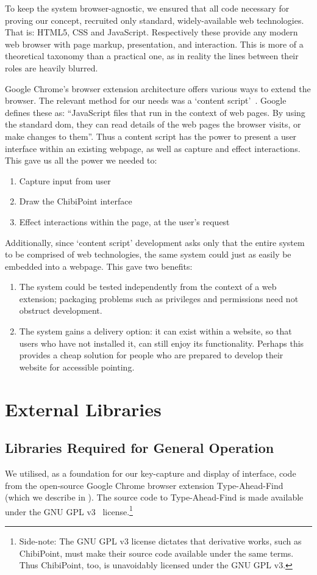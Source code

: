 \documentclass[11pt,openright,a4paper]{report}
\begin{document}
To keep the system browser-agnostic, we ensured that all code necessary for proving our concept, recruited only standard, widely-available web technologies. That is: HTML5, CSS and JavaScript. Respectively these provide any modern web browser with page markup, presentation, and interaction. This is more of a theoretical taxonomy than a practical one, as in reality the lines between their roles are heavily blurred.

Google Chrome's browser extension architecture offers various ways to extend the browser. The relevant method for our needs was a `content script'~\cite{contentscript}. Google defines these as: ``JavaScript files that run in the context of web pages. By using the standard \gls{dom}, they can read details of the web pages the browser visits, or make changes to them''.
Thus a content script has the power to present a user interface within an existing webpage, as well as capture and effect interactions. This gave us all the power we needed to:

\begin{enumerate}
\item Capture input from user
\item Draw the ChibiPoint interface
\item Effect interactions within the page, at the user's request
\end{enumerate}

Additionally, since `content script' development asks only that the entire system to be comprised of web technologies, the same system could just as easily be embedded into a webpage. This gave two benefits:

\begin{enumerate}
\item The system could be tested independently from the context of a web extension; packaging problems such as privileges and permissions need not obstruct development.
\item The system gains a delivery option: it can exist within a website, so that users who have not installed it, can still enjoy its functionality. Perhaps this provides a cheap solution for people who are prepared to develop their website for accessible pointing.
\end{enumerate}

\section{External Libraries}
\subsection{Libraries Required for General Operation}
We utilised, as a foundation for our key-capture and display of interface, code from the open-source Google Chrome browser extension Type-Ahead-Find~\cite{typeaheadfind,typeaheadfindsource} (which we describe in ). The source code to Type-Ahead-Find is made available under the GNU GPL v3~\cite{gnugpl} license.\footnote{Side-note: The GNU GPL v3 license dictates that derivative works, such as ChibiPoint, must make their source code available under the same terms. Thus ChibiPoint, too, is unavoidably licensed under the GNU GPL v3.}
\end{document}
